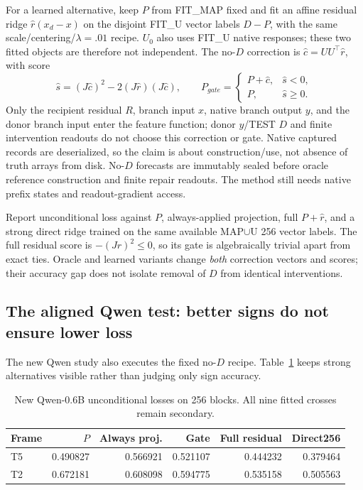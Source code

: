 For a learned alternative, keep $P$ from FIT\_MAP fixed and fit an affine residual ridge $\widehat r(x_d-x)$ on the disjoint FIT\_U vector labels $D-P$, with the same scale/centering/$\lambda=.01$ recipe. $U_0$ also uses FIT\_U native responses; these two fitted objects are therefore not independent. The no-$D$ correction is $\widehat c=UU^\top\widehat r$, with score
\[
 \widehat s=(J\widehat c)^2-2(J\widehat r)(J\widehat c),
 \qquad P_{gate}=\begin{cases}P+\widehat c,&\widehat s<0,\\P,&\widehat s\geq0.\end{cases}
\]
Only the recipient residual $R$, branch input $x$, native branch output $y$, and the donor branch input enter the feature function; donor $y$/TEST $D$ and finite intervention readouts do not choose this correction or gate. Native captured records are deserialized, so the claim is about construction/use, not absence of truth arrays from disk. No-$D$ forecasts are immutably sealed before oracle reference construction and finite repair readouts. The method still needs native prefix states and readout-gradient access.

Report unconditional loss against $P$, always-applied projection, full $P+\widehat r$, and a strong direct ridge trained on the same available MAP$\cup$U 256 vector labels. The full residual score is $-(J\widehat r)^2\leq0$, so its gate is algebraically trivial apart from exact ties. Oracle and learned variants change \emph{both} correction vectors and scores; their accuracy gap does not isolate removal of $D$ from identical interventions.

\subsection{The aligned Qwen test: better signs do not ensure lower loss}

The new Qwen study also executes the fixed no-$D$ recipe. Table~\ref{tab:qgate} keeps strong alternatives visible rather than judging only sign accuracy.
\begin{table}[ht]\centering\small
\begin{tabular}{lrrrrr}\toprule
Frame & $P$ & Always proj. & Gate & Full residual & Direct256\\\midrule
T5 & 0.490827 & 0.566921 & 0.521107 & 0.444232 & 0.379464 \\
T2 & 0.672181 & 0.608098 & 0.594775 & 0.535158 & 0.505563 \\
\bottomrule\end{tabular}
\caption{New Qwen-0.6B unconditional losses on 256 blocks. All nine fitted crosses remain secondary.}\label{tab:qgate}
\end{table}

